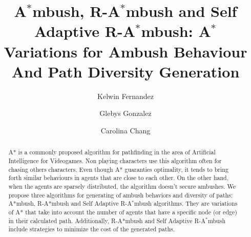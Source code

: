 \documentclass[runningheads,a4paper]{llncs}
\begin{document}
\mainmatter  %

\title{A$^*$mbush, R-A$^*$mbush and Self Adaptive R-A$^*$mbush:
A$^*$ Variations for Ambush Behaviour And Path Diversity
Generation}


%
%
\author{Kelwin Fernandez \and Glebys Gonzalez \and Carolina Chang}
%


%
%

\maketitle


\begin{abstract}
A* is a commonly proposed algorithm 
for pathfinding in the area of Artificial Intelligence for
Videogames. Non playing characters use this algorithm often for
chasing others characters.
Even though A* guaranties optimality, it tends to bring forth
 similar behaviours in agents that are close to each other. On the other hand, 
when the agents are sparsely distributed, the algorithm doesn't secure
ambushes. We propose three algorithms for generating of ambush behaviors 
and diversity of paths: A*mbush, R-A*mbush and Self Adaptive
R-A$^*$mbush algorithms. They are
variations of A* that take into account the number of agents that have
a specific node (or edge)  in their calculated path. Additionally, R-A*mbush and Self Adaptive R-A$^*$mbush include strategies to minimize the
cost of the generated paths.
\end{abstract}



%




\end{document}
